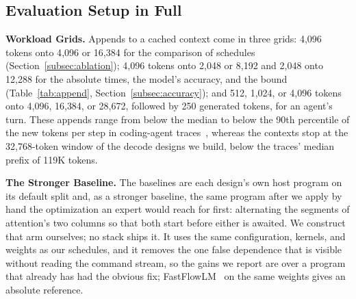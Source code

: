 \subsection{Evaluation Setup in Full}
\label{app:setup}

\textbf{Workload Grids.}
Appends to a cached context come in three grids: 4{,}096 tokens onto 4{,}096 or 16{,}384 for the comparison of schedules (Section~\ref{subsec:ablation}); 4{,}096 tokens onto 2{,}048 or 8{,}192 and 2{,}048 onto 12{,}288 for the absolute times, the model's accuracy, and the bound (Table~\ref{tab:append}, Section~\ref{subsec:accuracy}); and 512, 1{,}024, or 4{,}096 tokens onto 4{,}096, 16{,}384, or 28{,}672, followed by 250 generated tokens, for an agent's turn.
These appends range from below the median to below the 90th percentile of the new tokens per step in coding-agent traces~\citep{zhu2026tracelab}, whereas the contexts stop at the 32{,}768-token window of the decode designs we build, below the traces' median prefix of 119K tokens.

\textbf{The Stronger Baseline.}
The baselines are each design's own host program on its default split and, as a stronger baseline, the same program after we apply by hand the optimization an expert would reach for first: alternating the segments of attention's two columns so that both start before either is awaited. We construct that arm ourselves; no stack ships it. It uses the same configuration, kernels, and weights as our schedules, and it removes the one false dependence that is visible without reading the command stream, so the gains we report are over a program that already has had the obvious fix; FastFlowLM~\citep{fastflowlm-repo} on the same weights gives an absolute reference.

